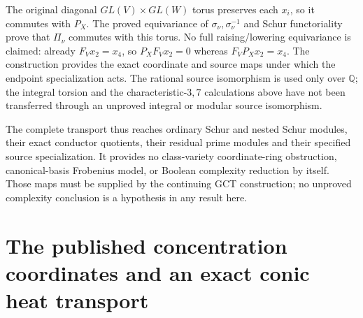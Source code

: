 The original diagonal $GL(V)\times GL(W)$ torus preserves each
$x_i$, so it commutes with $P_X$. The proved equivariance of
$\sigma_\nu,\sigma_\nu^{-1}$ and Schur functoriality prove that $\Pi_\nu$ commutes
with this torus. No full raising/lowering equivariance is claimed:
already $F_Vx_2=x_4$, so $P_XF_Vx_2=0$ whereas
$F_VP_Xx_2=x_4$. The construction provides the exact coordinate
and source maps under which the endpoint specialization acts.
The rational source isomorphism is used only over $\mathbb Q$;
the integral torsion and the characteristic-$3,7$ calculations
above have not been transferred through an unproved integral or
modular source isomorphism.

The complete transport thus reaches ordinary Schur and nested Schur
modules, their exact conductor quotients, their residual prime
modules and their specified source specialization. It provides no
class-variety coordinate-ring obstruction, canonical-basis
Frobenius model, or Boolean complexity reduction by itself. Those
maps must be supplied by the continuing GCT construction; no
unproved complexity conclusion is a hypothesis in any result here.


\section{The published concentration coordinates and an exact conic heat transport}
\label{sec:ns-conic-transport}

